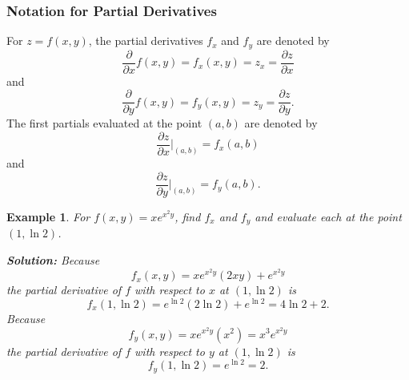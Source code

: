 \documentclass[titlepage,a4paper,12pt]{report}
\newtheorem{example}{Example}[section]
\begin{document}
 \subsubsection{Notation for Partial Derivatives}
For $z=f(x,y)$, the partial derivatives $f_x$ and $f_y$ are denoted by 
\[\dfrac{\partial }{\partial x} f(x,y)=f_x(x,y)=z_x=\dfrac{\partial z}{\partial x}\] and 
\[\dfrac{\partial }{\partial y} f(x,y)=f_y(x,y)=z_y=\dfrac{\partial z}{\partial y}.\] 
The first partials evaluated at the point $(a,b)$ are denoted by 
\[\dfrac{\partial z}{\partial x}\Biggl |_{(a,b)}=f_x(a,b)\] and 
\[\dfrac{\partial z}{\partial y}\Biggl |_{(a,b)}=f_y(a,b).\]
\begin{example}
For $f(x,y)=xe^{x^2y}$, find $f_x$ and $f_y$ and evaluate each at the point $(1, \ln 2)$.

\noindent \textbf{Solution:} Because 
\[f_x(x,y)=xe^{x^2y}(2xy)+e^{x^2y}\] the partial derivative of $f$ with respect to $x$ at $(1,\ln 2)$ is 
\[f_x(1,\ln 2)=e^{\ln 2}(2\ln 2)+e^{\ln 2}=4\ln 2 +2.\]
Because 
\[f_y(x,y)=xe^{x^2y}(x^2)=x^3e^{x^2y}\] the partial derivative of $f$ with respect to $y$ at $(1,\ln 2)$ is 
\[f_y(1,\ln 2)=e^{\ln 2}=2.\]
\end{example}
\end{document}
